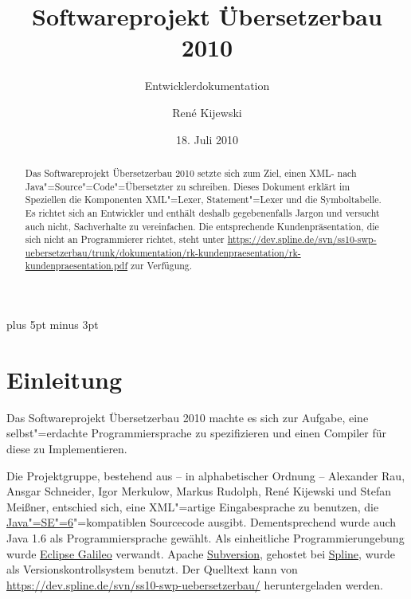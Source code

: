 \documentclass[10pt,a4paper,ngerman,titlepage,tocindentauto]{scrartcl}
\newcommand{\link}[1]{\href{#1}{#1}}
\begin{document}
	\begin{titlepage}
		\titlehead{\texttt{[image: graphiken/Fub-logo.pdf]}}
		\title{Softwareprojekt Übersetzerbau 2010} 
		\subtitle{Entwicklerdokumentation}
		\author{René Kijewski} 
		\date{18. Juli 2010 \vfill}
		\maketitle
	\end{titlepage}
	
	\begin{abstract}
		Das Softwareprojekt Übersetzerbau 2010 setzte sich zum Ziel, einen XML- nach Java"=Source"=Code"=Übersetzter
		zu schreiben.
		Dieses Dokument erklärt im Speziellen die Komponenten XML"=Lexer, Statement"=Lexer
		und die Symboltabelle. Es richtet sich an Entwickler und enthält deshalb gegebenenfalls
		Jargon und versucht auch nicht, Sachverhalte zu vereinfachen.
		Die entsprechende Kundenpräsentation, die sich nicht an Programmierer richtet, steht unter
		\link{https://dev.spline.de/svn/ss10-swp-uebersetzerbau/trunk/dokumentation/rk-kundenpraesentation/rk-kundenpraesentation.pdf}
		zur Verfügung.
	\end{abstract}

	{
		\pagestyle{empty}
		\tableofcontents
		\newpage
	}
	
	\parskip 7pt plus 5pt minus 3pt
	\setcounter{page}{1}
	\section{Einleitung}
		Das Softwareprojekt Übersetzerbau 2010 machte es sich zur Aufgabe, eine selbst"=erdachte Programmiersprache
		zu spezifizieren und einen Compiler für diese zu Implementieren.
		
		Die Projektgruppe, bestehend aus -- in alphabetischer Ordnung --
			Alexander Rau,
			Ansgar Schneider,
			Igor Merkulow,
			Markus Rudolph,
			René Kijewski und
			Stefan Meißner,
		entschied sich, eine XML"=artige Eingabesprache zu benutzen, die
		\href{http://java.sun.com/javase/6/}{Java"=SE"=6}"=kompatiblen Sourcecode ausgibt.
		Dementsprechend wurde auch Java 1.6 als Programmiersprache gewählt.
		Als einheitliche Programmierungebung wurde \href{http://www.eclipse.org/galileo/}{Eclipse Galileo} verwandt.
		Apache \href{http://subversion.apache.org/}{Subversion}, gehostet bei \href{http://dev.spline.de/}{Spline}, wurde als
		Versionskontrollsystem benutzt. Der Quelltext kann von \link{https://dev.spline.de/svn/ss10-swp-uebersetzerbau/}
		heruntergeladen werden.
		
\end{document}
